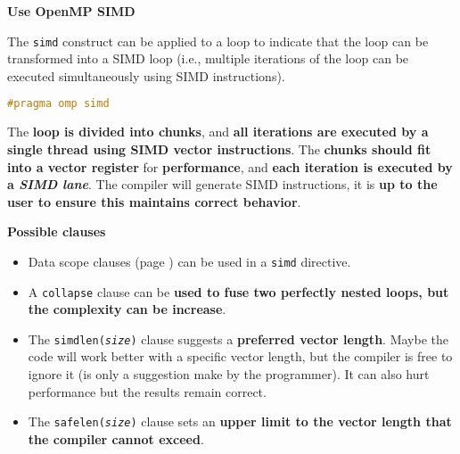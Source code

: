 \newpage

\begin{flushleft}
    \textcolor{Green3}{ \textbf{Use OpenMP SIMD}}
\end{flushleft}
The \texttt{simd} construct can be applied to a loop to indicate that the loop can be transformed into a SIMD loop (i.e., multiple iterations of the loop can be executed simultaneously using SIMD instructions).

\begin{openmpbox}
    \begin{lstlisting}[language=C++]
#pragma omp simd\end{lstlisting}
\end{openmpbox}

\noindent
The \textbf{loop is divided into chunks}, and \textbf{all iterations are executed by a single thread using SIMD vector instructions}. The \textbf{chunks should fit into a vector register} for \textcolor{Green4}{\textbf{performance}}, and \textbf{each iteration is executed by a \emph{SIMD lane}}. The compiler will generate SIMD instructions, it is \textbf{up to the user to ensure this maintains correct behavior}.

\highspace
\begin{flushleft}
    \textcolor{Green3}{ \textbf{Possible clauses}}
\end{flushleft}
\begin{itemize}
    \item Data scope clauses (page \pageref{subsection: Data environment}) can be used in a \texttt{simd} directive.

    \item A \texttt{collapse} clause can be \textbf{used to fuse two perfectly nested loops, but the complexity can be increase}.
    
    \item The \texttt{simdlen(\emph{size})} clause suggests a \textbf{preferred vector length}. Maybe the code will work better with a specific vector length, but the compiler is free to ignore it (is only a suggestion make by the programmer). It can also hurt performance but the results remain correct.
    
    \item The \texttt{safelen(\emph{size})} clause sets an \textbf{upper limit to the vector length that the compiler cannot exceed}.
\end{itemize}

